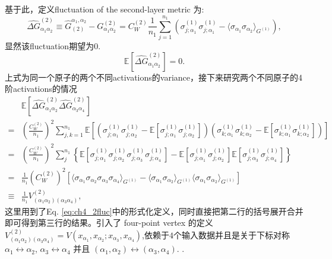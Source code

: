 基于此，定义fluctuation of the second-layer metric 为:
\begin{equation}
    \hat{\Delta G}_{\alpha_1\alpha_2}^{(2)} \equiv \hat{G}^{\alpha_1,\alpha_2}_{(2)} -
    G_{\alpha_1\alpha_2}^{(2)} = C_W^{(2)}\frac{1}{n_1} \sum_{j=1}^{n_1}
    \left(\sigma_{j;\alpha_1}^{(1)}\sigma_{j;\alpha_1}^{(1)} - 
    \langle\sigma_{\alpha_1}\sigma_{\alpha_2}\rangle_{G^{(1)}}\right),
    \label{eq:ch4_fluc_metric_layer2}
\end{equation}
显然该fluctuation期望为$0$.
\begin{equation}
    \mathbb{E}\left[\hat{\Delta G}_{\alpha_1\alpha_2}^{(2)}\right] = 0.
\end{equation}
上式为同一个原子的两个不同activations的variance，接下来研究两个不同原子的4阶activations的情况
\begin{equation}
    \begin{aligned}
    & \mathbb{E}\left[\hat{\Delta G}_{\alpha_1\alpha_2}^{(2)} 
    \hat{\Delta G}_{\alpha_3\alpha_4}^{(2)}\right] \\
    =& \left(\frac{C_W^{(2)}}{n_1}\right)^2\sum_{j,k=1}^{n_1}\mathbb{E}\left[\left(
    \sigma_{j;\alpha_1}^{(1)}\sigma_{j;\alpha_2}^{(1)} - \mathbb{E}\left[
    \sigma_{j;\alpha_1}^{(1)}\sigma_{j;\alpha_2}^{(1)} \right]\right)
    \left(\sigma_{k;\alpha_1}^{(1)}\sigma_{k;\alpha_2}^{(1)} - \mathbb{E}\left[
    \sigma_{k;\alpha_1}^{(1)}\sigma_{k;\alpha_2}^{(1)} \right]\right)\right] \\
    =& \left(\frac{C_W^{(2)}}{n_1}\right)^2\sum_{j}^{n_1}\left\{\mathbb{E}\left[
    \sigma_{j;\alpha_1}^{(1)}\sigma_{j;\alpha_2}^{(1)}
    \sigma_{j;\alpha_3}^{(1)}\sigma_{j;\alpha_4}^{(1)}\right] - 
    \mathbb{E}\left[ \sigma_{j;\alpha_1}^{(1)}\sigma_{j;\alpha_2}^{(1)}\right]
    \mathbb{E}\left[ \sigma_{j;\alpha_3}^{(1)}\sigma_{j;\alpha_4}^{(1)}\right] \right\} \\
    =& \frac{1}{n_1}\left(C_W^{(2)}\right)^2\left[\langle\sigma_{\alpha_1}\sigma_{\alpha_2} 
    \sigma_{\alpha_3}\sigma_{\alpha_4}\rangle_{G^{(1)}} - \langle\sigma_{\alpha_1}
    \sigma_{\alpha_2}\rangle_{G^{(1)}}
    \langle\sigma_{\alpha_1}\sigma_{\alpha_2}\rangle_{G^{(1)}}\right] \\
    \equiv & \frac{1}{n_1} V_{(\alpha_1\alpha_2)(\alpha_3\alpha_4)}^{(2)},
    \end{aligned}
    \label{eq:ch4_4point_vertex}
\end{equation}
这里用到了Eq. \ref{eq:ch4_2fluc}中的形式化定义，同时直接把第二行的括号展开合并即可得到第三行的结果。引入了
four-point vertex 的定义$V_{(\alpha_1\alpha_2)(\alpha_3\alpha_4)}^{(2)}=V\left(x_{\alpha_1},x_{\alpha_2};
x_{\alpha_3},x_{\alpha_4}\right)$,依赖于$4$个输入数据并且是关于下标对称 $\alpha_1 \leftrightarrow \alpha_2$, 
$\alpha_3 \leftrightarrow \alpha_4$ 并且 $(\alpha_1, \alpha_2) \leftrightarrow (\alpha_3, \alpha_4)$.
. 

